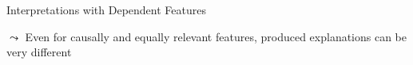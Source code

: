 \documentclass[11pt,compress,t,notes=noshow, aspectratio=169, xcolor=table]{beamer}
\begin{document}
\begin{frame}{Interpretations with Dependent Features}
\begin{itemize}
$\leadsto$ Even for causally and equally relevant features, produced explanations can be very different




\end{itemize}
\end{frame}
\end{document}
